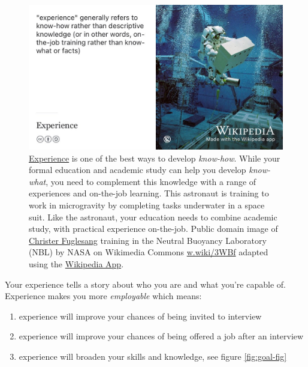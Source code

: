 \documentclass[
]{book}
\providecommand{\tightlist}{%
  \setlength{\itemsep}{0pt}\setlength{\parskip}{0pt}}
\begin{document}
\begin{figure}

{\centering \includegraphics[width=1\linewidth]{images/experience} 

}

\caption{\href{https://en.wikipedia.org/wiki/Experience}{Experience} is one of the best ways to develop \emph{know-how}. While your formal education and academic study can help you develop \emph{know-what}, you need to complement this knowledge with a range of experiences and on-the-job learning. This astronaut is training to work in microgravity by completing tasks underwater in a space suit. Like the astronaut, your education needs to combine academic study, with practical experience on-the-job. Public domain image of \href{https://en.wikipedia.org/wiki/Christer_Fuglesang}{Christer Fuglesang} training in the Neutral Buoyancy Laboratory (NBL) by NASA on Wikimedia Commons \href{https://w.wiki/3WBf}{w.wiki/3WBf} adapted using the \href{https://apps.apple.com/us/app/wikipedia/id324715238}{Wikipedia App}.}\label{fig:experience-fig}
\end{figure}



Your experience tells a story about who you are and what you're capable of. Experience makes you more \emph{employable} which means:

\begin{enumerate}
\def\labelenumi{\arabic{enumi}.}
\tightlist
\item
  experience will improve your chances of being invited to interview
\item
  experience will improve your chances of being offered a job after an interview
\item
  experience will broaden your skills and knowledge, see figure \ref{fig:goal-fig}
\end{enumerate}
\end{document}
